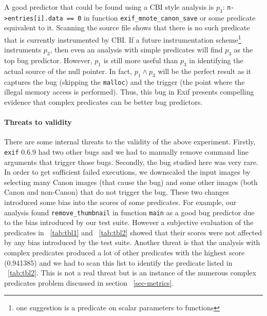 A good predictor that could be found using a CBI style analysis is $p_3$: \texttt{n->entries[i].data == 0} in function \texttt{exif\_\-mnote\_\-canon\_save} or some predicate equivalent to it.  Scanning the source file shows that there is no such predicate that is currently instrumented by CBI.  If a future instrumentation scheme{\footnote{one suggestion is a predicate on scalar parameters to functions}} instruments $p_3$, then even an analysis with simple predicates will find $p_3$ as the top bug predictor.  However, $p_1$ is still more useful than $p_3$ in identifying the actual source of the null pointer.  In fact, $p_1 \wedge p_3$ will be the perfect result as it captures the bug (skipping the \texttt{malloc}) and the trigger (the point where the illegal memory access is performed).  Thus, this bug in Exif presents compelling evidence that complex predicates can be better bug predictors.

\paragraph{Threats to validity}

There are some internal threats to the validity of the above experiment.  Firstly, \texttt{exif} 0.6.9 had two other bugs and we had to manually remove command line arguments that trigger those bugs.  Secondly, the bug studied here was very rare.  In order to get sufficient failed executions, we downscaled the input images by selecting many Canon images (that cause the bug) and some other images (both Canon and non-Canon) that do not trigger the bug.  These two changes introduced some bias into the scores of some predicates.  For example, our analysis found \texttt{remove\_thumbnail} in function \texttt{main} as a good bug predictor due to the bias introduced by our test suite.  However a subjective evaluation of the predicates in ~\autoref{tab:tbl1} and ~\autoref{tab:tbl2} showed that their scores were not affected by any bias introduced by the test suite.  Another threat is that the analysis with complex predicates produced a lot of other predicates with the highest score (0.941385) and we had to scan this list to identify the predicate listed in ~\autoref{tab:tbl2}.  This is not a real threat but is an instance of the numerous complex predicates problem discussed in section ~\ref{sec-metrics}.

